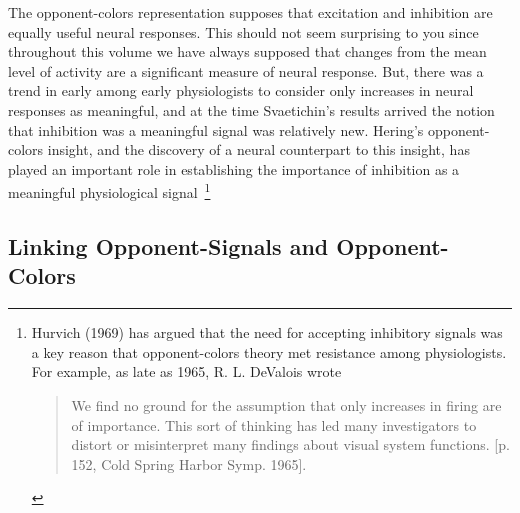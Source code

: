 The opponent-colors representation supposes that excitation and
inhibition are equally useful neural responses.  This should not seem
surprising to you since throughout this volume we have always supposed
that changes from the mean level of activity are a significant measure
of neural response.  But, there was a trend in early among early
physiologists to consider only increases in neural responses as
meaningful, and at the time Svaetichin's results arrived the notion
that inhibition was a meaningful signal was relatively new.  Hering's
opponent-colors insight, and the discovery of a neural counterpart to
this insight, has played an important role in establishing the
importance of inhibition as a meaningful physiological
signal~\footnote{Hurvich (1969) has argued that the need for accepting
inhibitory signals was a key reason that opponent-colors theory met
resistance among physiologists.  For example, as late as 1965,
R. L. DeValois wrote
\begin{quote}
We find no ground for the assumption that only increases in firing are
of importance.  This sort of thinking has led many investigators to
distort or misinterpret many findings about visual system functions.
[p. 152, Cold Spring Harbor Symp. 1965].
\end{quote}
}

\subsection*{Linking Opponent-Signals and Opponent-Colors}
